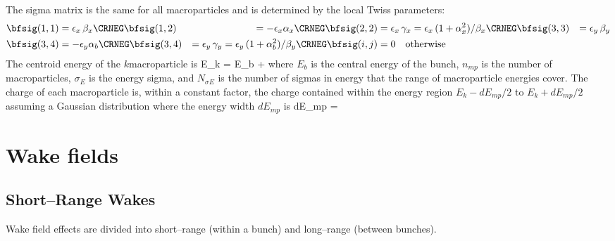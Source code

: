 The sigma matrix is the same for all macroparticles and is
determined by the local Twiss parameters:
\begin{align}
  \bfsig(1,1) &= \epsilon_x \, \beta_x \CRNEG
  \bfsig(1,2) &= -\epsilon_x \alpha_x  \CRNEG
  \bfsig(2,2) &= \epsilon_x \, \gamma_x = 
      \epsilon_x \, (1 + \alpha_x^2) / \beta_x \CRNEG
  \bfsig(3,3) &= \epsilon_y \, \beta_y \\
  \bfsig(3,4) &= -\epsilon_y \alpha_b \CRNEG
  \bfsig(3,4) &= \epsilon_y \, \gamma_y = 
      \epsilon_y \, (1 + \alpha_b^2) / \beta_y \CRNEG
  \bfsig(i,j) &= 0 \quad \mbox{otherwise} \nonumber
\end{align}
The centroid energy of the $k$\Th macroparticle is
\Begineq
  E_k = E_b + 
\Endeq
where $E_b$ is the central energy of the bunch, $n_{mp}$ is the number
of macroparticles, $\sigma_E$ is the energy sigma, and
$N_{\sigma E}$ is the number of sigmas in energy that the range of
macroparticle energies cover. The charge of each macroparticle is,
within a constant factor, the charge contained within the energy
region $E_k - dE_{mp}/2$ to $E_k + dE_{mp}/2$ assuming a Gaussian
distribution where the energy width $dE_{mp}$ is
\Begineq
  dE_{mp} = 
\Endeq

\section{Wake fields}
\label{s:wake fields}

\subsection{Short--Range Wakes}

Wake field effects are divided into short--range (within a bunch) and
long--range (between bunches).

